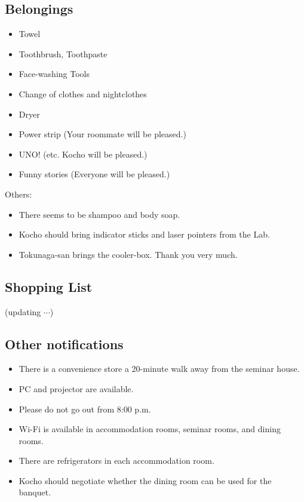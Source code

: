 \documentclass[unicode,a4paper,11pt]{ltjsarticle}
\begin{document}
\subsection*{Belongings}

\begin{itemize}
      \item
            Towel
      \item
            Toothbrush, Toothpaste
      \item
            Face-washing Tools
      \item
            Change of clothes and nightclothes
      \item
            Dryer
      \item
            Power strip (Your roommate will be pleased.)
      \item
            UNO! (etc. Kocho will be pleased.)
      \item
            Funny stories (Everyone will be pleased.)
\end{itemize}

Others:
\begin{itemize}
      \item
            There seems to be shampoo and body soap.
      \item
            Kocho should bring indicator sticks and laser pointers from the Lab.
      \item
            Tokunaga-san brings the cooler-box. Thank you very much.
\end{itemize}


\subsection*{Shopping List}

(updating $\cdots$)


\subsection*{Other notifications}

\begin{itemize}
      \item
            There is a convenience store a 20-minute walk away from the seminar house.
      \item
            PC and projector are available.
      \item
            Please do not go out from 8:00 p.m.
      \item
            Wi-Fi is available in accommodation rooms, seminar rooms, and dining rooms.
      \item
            There are refrigerators in each accommodation room.
      \item
            Kocho should negotiate whether the dining room can be used for the banquet.
\end{itemize}
\end{document}
